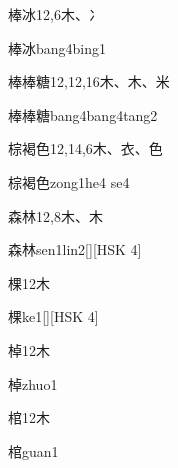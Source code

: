 \begin{entry}{棒冰}{12,6}{⽊、⼎}
  \begin{phonetics}{棒冰}{bang4bing1}
  \end{phonetics}
\end{entry}

\begin{entry}{棒棒糖}{12,12,16}{⽊、⽊、⽶}
  \begin{phonetics}{棒棒糖}{bang4bang4tang2}
  \end{phonetics}
\end{entry}

\begin{entry}{棕褐色}{12,14,6}{⽊、⾐、⾊}
  \begin{phonetics}{棕褐色}{zong1he4 se4}
  \end{phonetics}
\end{entry}

\begin{entry}{森林}{12,8}{⽊、⽊}
  \begin{phonetics}{森林}{sen1lin2}[][HSK 4]
  \end{phonetics}
\end{entry}

\begin{entry}{棵}{12}{⽊}
  \begin{phonetics}{棵}{ke1}[][HSK 4]
  \end{phonetics}
\end{entry}

\begin{entry}{棹}{12}{⽊}
  \begin{phonetics}{棹}{zhuo1}
  \end{phonetics}
\end{entry}

\begin{entry}{棺}{12}{⽊}
  \begin{phonetics}{棺}{guan1}
  \end{phonetics}
\end{entry}

